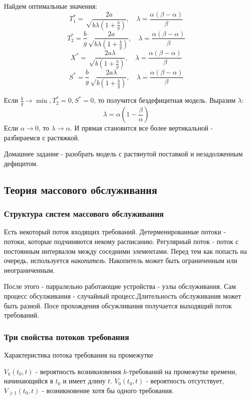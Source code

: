 \documentclass[aps,%
12pt,%
final,%
oneside,
onecolumn,%
musixtex, %
superscriptaddress,%
centertags]{article} %
\theoremstyle{plain}
\begin{document}
Найдем оптимальные значения:
$$T_1^* = \sqrt \frac{2a}{b\lambda (1+\frac{b}{g})}, \quad \lambda = \frac{\alpha(\beta-\alpha)}{\beta} $$
$$T_2^* = \frac{b}{g} \sqrt \frac{2a}{b\lambda (1+\frac{b}{g})}, \quad \lambda = \frac{\alpha(\beta-\alpha)}{\beta} $$
$$X^* = \sqrt \frac{2a\lambda}{b (1+\frac{b}{g})}, \quad \lambda = \frac{\alpha(\beta-\alpha)}{\beta} $$
$$S^* = \frac{b}{g} \sqrt \frac{2a\lambda}{b (1+\frac{b}{g})}, \quad \lambda = \frac{\alpha(\beta-\alpha)}{\beta} $$

Если $\frac{b}{g} \to \min , T_2^* = 0, S^* = 0$, то получится бездефицитная модель.
Выразим $\lambda$: 
$$ \lambda = \alpha (1-\frac{\beta}{\alpha})$$
Если $\alpha \to 0$, то $\lambda \to \alpha $. И прямая становится все более вертикальной - разбираемся с растяжкой.

Домашнее задание - разобрать модель с растянутой поставкой и незадолженным дефицитом.

\subsection{Теория массового обслуживания}

\subsubsection{Структура систем массового обслуживания}

Есть некоторый поток входящих требований. Детерменированные потоки - потоки, которые подчиняются некому расписанию. Регулярный поток - поток с постоянным интервалом между соседними элементами. Перед тем как попасть на очередь, используется \textit{накопитель}. Накопитель может быть ограниченным или неограниченным. 

После этого  - парралельно работающие устройства - узлы обслуживания. Сам процесс обсулживания - случайный процесс.Длительность обслуживания может быть разной. Посе прохождения обсужливания получается выходящий поток требований.

\subsubsection{Три свойства потоков требования}

Характеристика потока требования на промежутке

$V_k(t_0,t) $ -  вероятность возникновения $k$-требований на промежутке времени, начинающийся в $t_0$ и имеет длину $t$.
$V_0(t_0,t)$ - вероятность отсутствует,
$V_{\geq 1} (t_0,t)$ - возникновение хотя бы одного требования.
\end{document}
